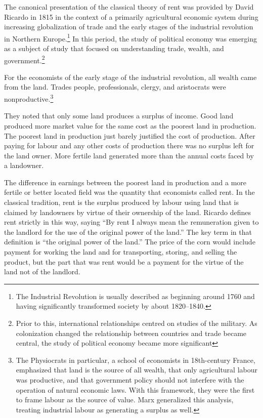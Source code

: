 The canonical presentation of the classical theory of rent \cite{ricardoEssayInfluenceLow1815} was provided by David Ricardo in 1815 in the context of a primarily agricultural economic system during increasing globalization of trade and the early stages of the industrial revolution in Northern Europe.\footnote{The Industrial Revolution is usually described as beginning around 1760 and having significantly transformed society by about 1820--1840.} In this period, the study of \gls{political economy} was emerging as a subject of study that focused on understanding trade, wealth, and government.\footnote{Prior to this, international relationships centred on studies of the military. As colonization changed the relationship between countries and trade became central, the study of \gls{political economy} became more significant}

For the economists of the early stage of the industrial revolution, %
all wealth came from the land. Trades people, professionals, clergy, and aristocrats were %
nonproductive.\footnote{The Physiocrats in particular, a school of economists in 18th-century France, emphasized  that land is the source of all wealth, that only agricultural labour was productive, and that government policy should not interfere with the operation of natural economic laws. With this framework, they were the first to frame labour as the source of value. Marx generalized this analysis, treating industrial labour as generating a surplus as well.}

They noted that only some land produces a surplus of income. Good land produced more market value for the same cost as the poorest land in production. The poorest land in production just barely justified the cost of production. After paying for labour and any other costs of production there was no surplus left for the land owner. More fertile land generated more than the annual costs faced by a landowner. 

The difference in earnings between the poorest land in production and a more fertile or better located field was the quantity that economists called rent. In the classical tradition, rent is the surplus produced by labour using land that is claimed by landowners by virtue of their ownership of the land. Ricardo defines rent strictly in this way, saying ``By rent I always mean the remuneration given to the landlord for the use of the original power of the land.''\cite{ricardoEssayInfluenceLow1815} The key term in that definition is ``the original power of the land.'' The price of the corn would include payment for working the land and for transporting, storing, and  selling the product, but the part that was rent would be a payment for the virtue of the land not of the landlord. %
  
